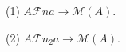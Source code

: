 (1) $A \mathcal{F}n a \rightarrow \mathcal{M}(A)$.

(2) $A \mathcal{F}n_2 a \rightarrow \mathcal{M}(A)$.
